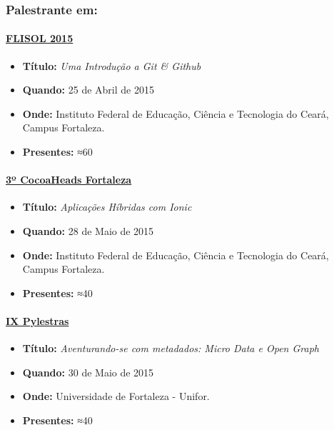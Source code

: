 \documentclass[]{article}
\providecommand{\tightlist}{%
  \setlength{\itemsep}{0pt}\setlength{\parskip}{0pt}}
\let\oldparagraph\paragraph
\renewcommand{\paragraph}[1]{\oldparagraph{#1}\mbox{}}
\begin{document}
\subsubsection{Palestrante em:}\label{palestrante-em}

\paragraph{\texorpdfstring{\href{http://flisolce.org/}{FLISOL
2015}}{FLISOL 2015}}\label{flisol-2015}

\begin{itemize}
\tightlist
\item
  \textbf{Título:} \emph{Uma Introdução a Git \& Github}
\item
  \textbf{Quando:} 25 de Abril de 2015
\item
  \textbf{Onde:} Instituto Federal de Educação, Ciência e Tecnologia do
  Ceará, Campus Fortaleza.
\item
  \textbf{Presentes:} ≈60
\end{itemize}

\paragraph{\texorpdfstring{\href{http://www.cocoaheads.com.br/agendas/detalhes/79/}{3º
CocoaHeads
Fortaleza}}{3º CocoaHeads Fortaleza}}\label{uxba-cocoaheads-fortaleza}

\begin{itemize}
\tightlist
\item
  \textbf{Título:} \emph{Aplicações Híbridas com Ionic}
\item
  \textbf{Quando:} 28 de Maio de 2015
\item
  \textbf{Onde:} Instituto Federal de Educação, Ciência e Tecnologia do
  Ceará, Campus Fortaleza.
\item
  \textbf{Presentes:} ≈40
\end{itemize}

\paragraph{\texorpdfstring{\href{http://pylestras.org/evento/ix-pylestras/}{IX
Pylestras}}{IX Pylestras}}\label{ix-pylestras}

\begin{itemize}
\tightlist
\item
  \textbf{Título:} \emph{Aventurando-se com metadados: Micro Data e Open
  Graph}
\item
  \textbf{Quando:} 30 de Maio de 2015
\item
  \textbf{Onde:} Universidade de Fortaleza - Unifor.
\item
  \textbf{Presentes:} ≈40
\end{itemize}
\end{document}
